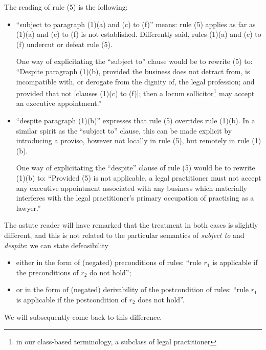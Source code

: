 The reading of rule (5) is the following:
\begin{itemize}
\item ``subject to paragraph (1)(a) and (c) to (f)'' means: rule (5) applies
  as far as (1)(a) and (c) to (f) is not established. Differently said, rules
  (1)(a) and (c) to (f) undercut or defeat rule (5).

  One way of explicitating the ``subject to'' clause would be to rewrite (5)
  to: ``Despite paragraph (1)(b), provided the business does not detract from,
  is incompatible with, or derogate from the dignity of, the legal profession;
  and provided that not [clauses (1)(c) to (f)]; then a locum
  sollicitor\footnote{in our class-based terminology, a subclass of legal
    practitioner} may accept an executive appointment.''

\item ``despite paragraph (1)(b)'' expresses that rule (5) overrides rule
  (1)(b). In a similar spirit as the ``subject to'' clause, this can be made
  explicit by introducing a proviso, however not locally in  rule (5), but
  remotely in rule (1)(b).

  One way of explicitating the ``despite'' clause of rule (5) would be to
  rewrite (1)(b) to: ``Provided (5) is not applicable, a legal practitioner
  must not accept any executive appointment associated with any business which
  materially interferes with the legal practitioner’s primary occupation of
  practising as a lawyer.''
\end{itemize}

The astute reader will have remarked that the treatment in both cases is
slightly different, and this is not related to the particular semantics of
\emph{subject to} and \emph{despite}: we can state defeasibility
\begin{itemize}
\item either in the form of (negated) preconditions of rules: ``rule $r_1$ is
  applicable if the preconditions of $r_2$ do not hold'';
\item or in the form of (negated) derivability of the postcondition of rules: ``rule $r_1$ is
  applicable if the postcondition of $r_2$ does not hold''.
\end{itemize}
We will subsequently come back to this difference.

